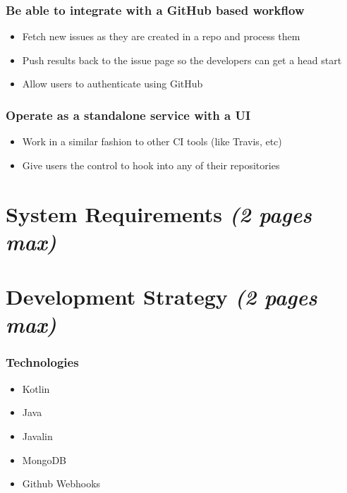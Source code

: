 \documentclass[12pt]{article}
\begin{document}
\subsubsection{Be able to integrate with a GitHub based
workflow}\label{be-able-to-integrate-with-a-github-based-workflow}

\begin{itemize}
\tightlist
\item
  Fetch new issues as they are created in a repo and process them
\item
  Push results back to the issue page so the developers can get a head
  start
\item
  Allow users to authenticate using GitHub
\end{itemize}

\subsubsection{Operate as a standalone service with a
UI}\label{operate-as-a-standalone-service-with-a-ui}

\begin{itemize}
\tightlist
\item
  Work in a similar fashion to other CI tools (like Travis, etc)
\item
  Give users the control to hook into any of their repositories
\end{itemize}

\section{\texorpdfstring{System Requirements \emph{(2 pages
max)}}{System Requirements (2 pages max)}}\label{system-requirements-2-pages-max}

\section{\texorpdfstring{Development Strategy \emph{(2 pages
max)}}{Development Strategy (2 pages max)}}\label{development-strategy-2-pages-max}

\subsubsection{Technologies}\label{technologies}

\begin{itemize}
\tightlist
\item
  Kotlin
\item
  Java
\item
  Javalin
\item
  MongoDB
\item
  Github Webhooks
\end{itemize}
\end{document}
